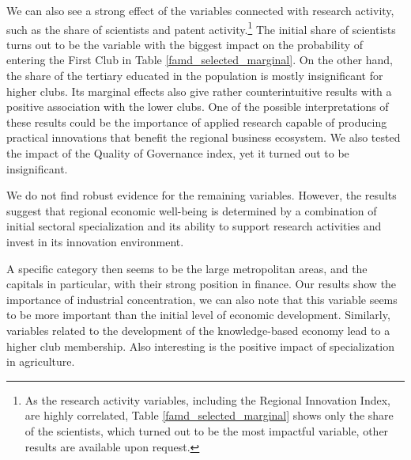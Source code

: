 \documentclass[11pt]{article}
\begin{document}
We can also see a strong effect of the variables connected with research activity, such as the share of scientists and patent activity.\footnote{As the research activity variables, including the Regional Innovation Index, are highly correlated, Table \ref{famd_selected_marginal} shows only the share of the scientists, which turned out to be the most impactful variable, other results are available upon request.} The initial share of scientists turns out to be the variable with the biggest impact on the probability of entering the First Club in Table \ref{famd_selected_marginal}.
On the other hand, the share of the tertiary educated in the population is mostly insignificant for higher clubs. Its marginal effects also give rather counterintuitive results with a positive association with the lower clubs. One of the possible interpretations of these results could be the importance of applied research capable of producing practical innovations that benefit the regional business ecosystem. We also tested the impact of the Quality of Governance index, yet it turned out to be insignificant.

We do not find robust evidence for the remaining variables. However, the results suggest that regional economic well-being is determined by a combination of initial sectoral specialization and its ability to support research activities and invest in its innovation environment.

A specific category then seems to be the large metropolitan areas, and the capitals in particular, with their strong position in finance. Our results show the importance of industrial concentration, we can also note that this variable seems to be more important than the initial level of economic development. Similarly, variables related to the development of the knowledge-based economy lead to a higher club membership. Also interesting is the positive impact of specialization in agriculture. 
\end{document}
